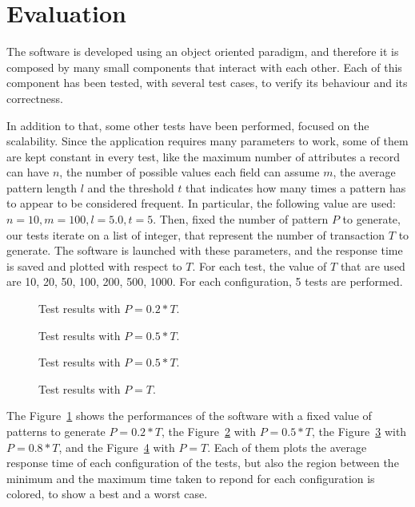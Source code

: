 \documentclass{acm_proc_article-sp-sigmod09}
\begin{document}
\section{Evaluation}
The software is developed using an object oriented paradigm, and therefore it is composed by many small components that interact with each other. Each of this component has been tested, with several test cases, to verify its behaviour and its correctness.

In addition to that, some other tests have been performed, focused on the scalability. Since the application requires many parameters to work, some of them are kept constant in every test, like the maximum number of attributes a record can have $n$, the number of possible values each field can assume $m$, the average pattern length $l$ and the threshold $t$ that indicates how many times a pattern has to appear to be considered frequent. In particular, the following value are used: $n = 10, m = 100, l = 5.0, t = 5$. Then, fixed the number of pattern $P$ to generate, our tests iterate on a list of integer, that represent the number of transaction $T$ to generate. The software is launched with these parameters, and the response time is saved and plotted with respect to $T$. For each test, the value of $T$ that are used are 10, 20, 50, 100, 200, 500, 1000. For each configuration, 5 tests are performed.

\begin{figure}
\centering
{}
\caption{Test results with $P = 0.2 * T$.}
\label{fig:zerotwo}
\end{figure}

\begin{figure}
\centering
{}
\caption{Test results with $P = 0.5 * T$.}
\label{fig:zerofive}
\end{figure}

\begin{figure}
\centering
{}
\caption{Test results with $P = 0.5 * T$.}
\label{fig:zeroeight}
\end{figure}

\begin{figure}
\centering
{}
\caption{Test results with $P = T$.}
\label{fig:one}
\end{figure}

The Figure~\ref{fig:zerotwo} shows the performances of the software with a fixed value of patterns to generate $P = 0.2 * T$, the Figure~\ref{fig:zerofive} with $P = 0.5 * T$, the Figure~\ref{fig:zeroeight} with $P = 0.8 * T$, and the Figure~\ref{fig:one} with $P = T$. Each of them plots the average response time of each configuration of the tests, but also the region between the minimum and the maximum time taken to repond for each configuration is colored, to show a best and a worst case.
\end{document}
